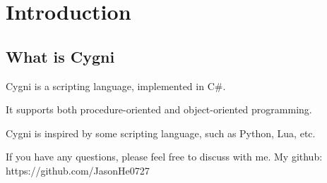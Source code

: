 \chapter{Introduction}
\section{What is Cygni}
Cygni is a scripting language, implemented in C\#.

It supports both procedure-oriented and object-oriented programming. 

Cygni is inspired by some scripting language, such as Python, Lua, etc. 

If you have any questions, please feel free to discuss with me. My github: https://github.com/JasonHe0727


